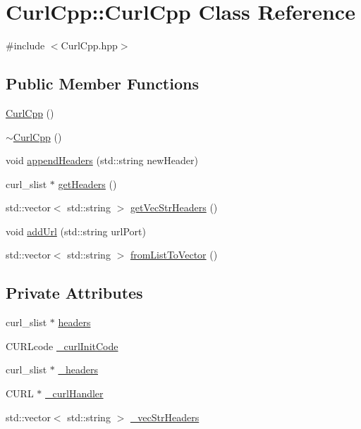 \hypertarget{class_curl_cpp_1_1_curl_cpp}{}\section{Curl\+Cpp\+:\+:Curl\+Cpp Class Reference}
\label{class_curl_cpp_1_1_curl_cpp}


{\ttfamily \#include $<$Curl\+Cpp.\+hpp$>$}

\subsection*{Public Member Functions}
\begin{DoxyCompactItemize}
\item 
\hyperlink{class_curl_cpp_1_1_curl_cpp_a00e67f746846377c451d915e83c564bf}{Curl\+Cpp} ()
\item 
\hyperlink{class_curl_cpp_1_1_curl_cpp_aeb659c8fb3d12f4a6e363fca418785dc}{$\sim$\+Curl\+Cpp} ()
\item 
void \hyperlink{class_curl_cpp_1_1_curl_cpp_afe16ac5d787c709cc04ebaf57afbfaa2}{append\+Headers} (std\+::string new\+Header)
\item 
curl\+\_\+slist $\ast$ \hyperlink{class_curl_cpp_1_1_curl_cpp_a9fad186212d2258e1f26e2d4b9dad498}{get\+Headers} ()
\item 
std\+::vector$<$ std\+::string $>$ \hyperlink{class_curl_cpp_1_1_curl_cpp_a0603b5b5a02bb86d2a2cb9e7e2385561}{get\+Vec\+Str\+Headers} ()
\item 
void \hyperlink{class_curl_cpp_1_1_curl_cpp_ade54efe4f6b4427b4df32bf84957b307}{add\+Url} (std\+::string url\+Port)
\item 
std\+::vector$<$ std\+::string $>$ \hyperlink{class_curl_cpp_1_1_curl_cpp_abc13a0fc97bdada59643ffad51b73387}{from\+List\+To\+Vector} ()
\end{DoxyCompactItemize}
\subsection*{Private Attributes}
\begin{DoxyCompactItemize}
\item 
curl\+\_\+slist $\ast$ \hyperlink{class_curl_cpp_1_1_curl_cpp_ada5ea161e25d1f657d0646067d843afc}{headers}
\item 
C\+U\+R\+Lcode \hyperlink{class_curl_cpp_1_1_curl_cpp_affd7aa2823468685baf06ba790f50dc4}{\+\_\+curl\+Init\+Code}
\item 
curl\+\_\+slist $\ast$ \hyperlink{class_curl_cpp_1_1_curl_cpp_a683cf293e1868db0ca6753ad8a5cd7d2}{\+\_\+headers}
\item 
C\+U\+R\+L $\ast$ \hyperlink{class_curl_cpp_1_1_curl_cpp_a51adae9da8e6effe1ff6cddce45f026e}{\+\_\+curl\+Handler}
\item 
std\+::vector$<$ std\+::string $>$ \hyperlink{class_curl_cpp_1_1_curl_cpp_acd6960ca4b1abe99aa00bca6a24dcace}{\+\_\+vec\+Str\+Headers}
\end{DoxyCompactItemize}


